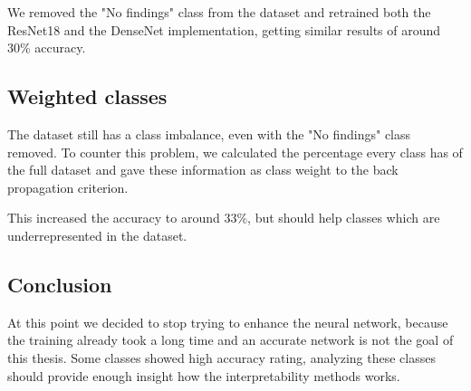 We removed the "No findings" class from the dataset and retrained both the ResNet18 and the DenseNet implementation, getting similar results of around 30\% accuracy.

\subsection{Weighted classes}
The dataset still has a class imbalance, even with the "No findings" class removed. To counter this problem, we calculated the percentage every class has of the full dataset and gave these information as class weight to the back propagation criterion.

This increased the accuracy to around 33\%, but should help classes which are underrepresented in the dataset.

\subsection{Conclusion}
At this point we decided to stop trying to enhance the neural network, because the training already took a long time and an accurate network is not the goal of this thesis. Some classes showed high accuracy rating, analyzing these classes should provide enough insight how the interpretability methods works.
